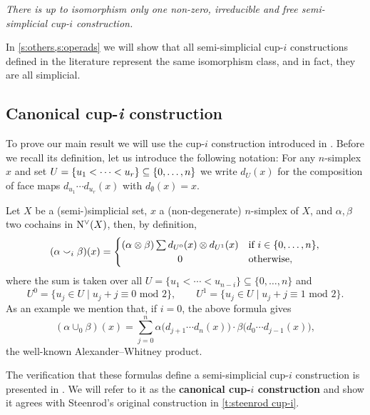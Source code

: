 \textit{There is up to isomorphism only one non-zero, irreducible and free semi-simplicial \mbox{cup-$i$} construction.}

In \cref{s:others,s:operads} we will show that all semi-simplicial \mbox{cup-$i$} constructions defined in the literature represent the same isomorphism class, and in fact, they are all simplicial.

\subsection{Canonical cup-\textit{i} construction}\label{ss:canonical}

To prove our main result we will use the \mbox{cup-$i$} construction introduced in \cite{medina2023fast_sq}.
Before we recall its definition, let us introduce the following notation:
For any $n$-simplex $x$ and set $U = \{u_1 < \dots < u_r\} \subseteq \set[big]{0,\dots,n}$ we write $d_U(x)$ for the composition of face maps $d_{u_1}\!\! \dotsm d_{u_r}(x)$ with $d_{\emptyset}(x) = x$.

Let $X$ be a (semi-)simplicial set, $x$ a (non-degenerate) $n$-simplex of $X$, and $\alpha, \beta$ two cochains in $\operatorname{N^{\vee}}(X)$, then, by definition,
\[
(\alpha \cup_i \beta)(x) =
\begin{cases}
	(\alpha \ot \beta) \sum d_{U^0}(x) \ot d_{U^1}(x) &
	\text{if } i \in \{0, \dots, n\}, \\
	\hfil 0 &
	\text{otherwise},
\end{cases}
\]
where the sum is taken over all $U = \{u_1 < \cdots < u_{n-i}\} \subseteq \{0, \dots, n\}$ and
\[
U^0 = \{u_j \in U \mid u_j + j \equiv 0 \text{ mod } 2\}, \qquad
U^1 = \{u_j \in U \mid u_j + j \equiv 1 \text{ mod } 2\}.
\]
As an example we mention that, if $i = 0$, the above formula gives
\[
(\alpha \cup_0 \beta)(x) =
\sum_{j=0}^n \alpha \big(d_{j+1} \cdots d_{n}(x)\big) \cdot \beta \big(d_{0} \cdots d_{j-1}(x)\big),
\]
the well-known Alexander--Whitney product.

The verification that these formulas define a semi-simplicial \mbox{cup-$i$} construction is presented in \cite{medina2023fast_sq}.
We will refer to it as the \textbf{canonical \mbox{cup-$i$} construction} and show it agrees with Steenrod's original construction in \cref{t:steenrod cup-i}.